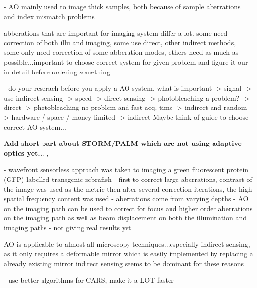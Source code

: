 - AO mainly used to image thick samples, both because of sample aberrations and index mismatch problems


abberations that are important for imaging system differ a lot, some need 
correction of both illu and imaging, some use direct, other indirect methods, 
some only need correction of some abberation modes, others need as much as 
possible...important to choose correct system for given problem and figure it 
our in detail before ordering something

- do your reserach before you apply a AO system, what is important
-> signal -> use indirect sensing
-> speed -> direct sensing
-> photobleaching a problem? -> direct
-> photobleaching no problem and fast acq. time -> indirect and random
-> hardware / space / money limited -> indirect
Maybe think of guide to choose correct AO system...



\textbf{Add short part about STORM/PALM which are not using adaptive optics yet...
} \cite{future_AOM_PALM_1}, 

\cite{scan_lightSheet} 
- wavefront sensorless approach was taken to imaging a green fluorescent protein (GFP) labelled transgenic zebrafish
- first to correct large aberrations, contrast of the image was used as the metric then after several correction iterations, the high spatial frequency content was used
- aberrations come from varying depths
- AO on the imaging path can be used to correct for focus and higher order aberrations on the imaging path as well as beam displacement on both the illumination and imaging paths
- not giving real results yet


AO is applicable to almost all microscopy techniques...especially indirect sensing, as it only requires a deformable mirror which is easily implemented by replacing a already existing mirror
indirect sensing seems to be dominant for these reasons

- use better algorithms for CARS, make it a LOT faster


